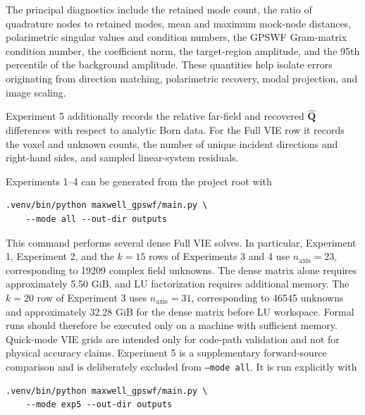 The principal diagnostics include the retained mode count, the ratio of
quadrature nodes to retained modes, mean and maximum mock-node distances,
polarimetric singular values and condition numbers, the GPSWF Gram-matrix
condition number, the coefficient norm, the target-region amplitude, and the
95th percentile of the background amplitude. These quantities help isolate
errors originating from direction matching, polarimetric recovery, modal
projection, and image scaling.

Experiment 5 additionally records the relative far-field and recovered
$\widehat{\mathbf{Q}}$ differences with respect to analytic Born data. For the
Full VIE row it records the voxel and unknown counts, the number of unique
incident directions and right-hand sides, and sampled linear-system residuals.

Experiments 1--4 can be generated from the project root with
\begin{verbatim}
.venv/bin/python maxwell_gpswf/main.py \
    --mode all --out-dir outputs
\end{verbatim}
This command performs several dense Full VIE solves. In particular,
Experiment 1, Experiment 2, and the $k=15$ rows of Experiments 3 and 4 use
$n_{\mathrm{axis}}=23$, corresponding to 19209 complex field unknowns. The
dense matrix alone requires approximately 5.50 GiB, and LU factorization
requires additional memory. The $k=20$ row of Experiment 3 uses
$n_{\mathrm{axis}}=31$, corresponding to 46545 unknowns and approximately
32.28 GiB for the dense matrix before LU workspace. Formal runs should therefore be
executed only on a machine with sufficient memory. Quick-mode VIE grids are
intended only for code-path validation and not for physical accuracy claims.
Experiment 5 is a supplementary forward-source comparison and is deliberately
excluded from \texttt{--mode all}. It is run explicitly with
\begin{verbatim}
.venv/bin/python maxwell_gpswf/main.py \
    --mode exp5 --out-dir outputs
\end{verbatim}
